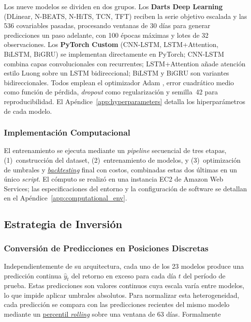 ﻿\documentclass[11pt,a4paper]{article}
\begin{document}
Los nueve modelos se dividen en dos grupos. Los \textbf{Darts Deep Learning} (DLinear, N-BEATS, N-HiTS, TCN, TFT) reciben la serie objetivo escalada y las 536 covariables pasadas, procesando ventanas de 30 d\'ias para generar predicciones un paso adelante, con 100 \'epocas m\'aximas y lotes de 32 observaciones. Los \textbf{PyTorch Custom} (CNN-LSTM, LSTM+Attention, BiLSTM, BiGRU) se implementan directamente en PyTorch; CNN-LSTM combina capas convolucionales con recurrentes; LSTM+Attention a\~nade atenci\'on estilo Luong sobre un LSTM bidireccional; BiLSTM y BiGRU son variantes bidireccionales. Todos emplean el optimizador Adam \citep{kingma2015}, error cuadr\'atico medio como funci\'on de p\'erdida, \textit{dropout} como regularizaci\'on y semilla~42 para reproducibilidad. El Ap\'endice~\ref{app:hyperparameters} detalla los hiperpar\'ametros de cada modelo.

\subsubsection{Implementaci\'on Computacional}

El entrenamiento se ejecuta mediante un \textit{pipeline} secuencial de tres etapas, (1)~construcci\'on del dataset, (2)~entrenamiento de modelos, y (3)~optimizaci\'on de umbrales y \hyperlink{glos:backtesting}{\textit{backtesting}} final con costos, combinadas estas dos \'ultimas en un \'unico \textit{script}. El c\'omputo se realiz\'o en una instancia EC2 de Amazon Web Services; las especificaciones del entorno y la configuraci\'on de software se detallan en el Ap\'endice~\ref{app:computational_env}.

\subsection{Estrategia de Inversi\'on}

\subsubsection{Conversi\'on de Predicciones en Posiciones Discretas}

Independientemente de su arquitectura, cada uno de los 23 modelos produce una predicci\'on continua $\hat{y}_t$ del retorno en exceso para cada d\'ia $t$ del per\'iodo de prueba. Estas predicciones son valores continuos cuya escala var\'ia entre modelos, lo que impide aplicar umbrales absolutos. Para normalizar esta heterogeneidad, cada predicci\'on se compara con las predicciones recientes del mismo modelo mediante un \hyperlink{glos:percentil_movil}{percentil \textit{rolling}} sobre una ventana de 63 d\'ias. Formalmente
\end{document}
